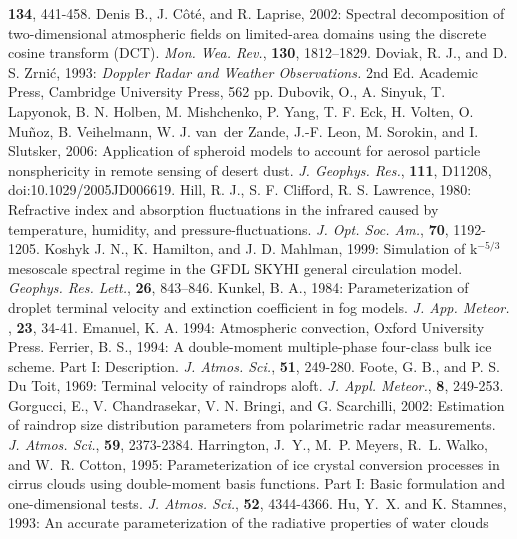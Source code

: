       {\bf 134},
      441-458.
\decrefname
Denis B., J. C\^{o}t\'{e}, and R. Laprise, 2002: Spectral decomposition of
  two-dimensional atmospheric fields on limited-area domains using the discrete
  cosine transform (DCT). {\em Mon. Wea. Rev.}, {\bf 130}, 1812--1829.
\decrefname
Doviak, R. J., and D. S. Zrni\'c, 1993:
      \textit{Doppler Radar and Weather Observations.}
      2nd Ed.
      Academic Press,
      Cambridge University Press,
      562 pp.
\decrefname
Dubovik, O., A. Sinyuk, T. Lapyonok, B. N. Holben, M. Mishchenko, P. Yang, T. F. Eck,
      H. Volten, O. Mu\~noz, B. Veihelmann, W. J. van~der Zande, J.-F. Leon, M. Sorokin,
      and I. Slutsker, 2006: Application of spheroid models to account for aerosol
      particle nonsphericity in remote sensing of desert dust.
      {\it J. Geophys. Res.}, {\bf 111}, D11208, doi:10.1029/2005JD006619.
\decrefname
Hill, R. J., S. F. Clifford, R. S. Lawrence, 1980:
      Refractive index and absorption fluctuations in the infrared 
      caused by temperature, humidity, and pressure-fluctuations.
      {\it J. Opt. Soc. Am.}, 
      {\bf 70},
      1192-1205.  
\decrefname
Koshyk J. N., K. Hamilton, and J. D. Mahlman, 1999: Simulation of k$^{-5/3}$ mesoscale
  spectral regime in the GFDL SKYHI general circulation model. {\em Geophys.
  Res. Lett.}, {\bf 26}, 843--846.
\decrefname
Kunkel, B. A., 1984: Parameterization of droplet terminal velocity and
extinction coefficient in fog models.
     {\it J. App. Meteor. },
      {\bf 23},
      34-41.     
\decrefname
Emanuel, K. A. 1994: Atmospheric convection, Oxford University Press.
\decrefname
Ferrier, B. S., 1994:
      A double-moment multiple-phase four-class bulk ice scheme.
      Part I: Description.
      {\it J. Atmos. Sci.},
      {\bf 51},
      249-280.
\decrefname
Foote, G. B., and P. S. Du Toit, 1969:
      Terminal velocity of raindrops aloft.
      {\it J. Appl. Meteor.},
      {\bf 8},
      249-253.
\decrefname
Gorgucci, E., V. Chandrasekar, V. N. Bringi, and G. Scarchilli, 2002:
      Estimation of raindrop size distribution parameters from polarimetric
      radar measurements.
      {\it J. Atmos. Sci.},
      {\bf 59},
      2373-2384.
\decrefname
Harrington, J.~Y., M.~P. Meyers, R.~L. Walko, and W.~R. Cotton, 1995:
  Parameterization of ice crystal conversion processes in cirrus clouds using
  double-moment basis functions. Part I: Basic formulation and one-dimensional
  tests. {\it J. Atmos. Sci.}, {\bf 52}, 4344-4366.
\decrefname
Hu, Y.~X. and K. Stamnes, 1993:
   An accurate parameterization of the radiative properties of water clouds
